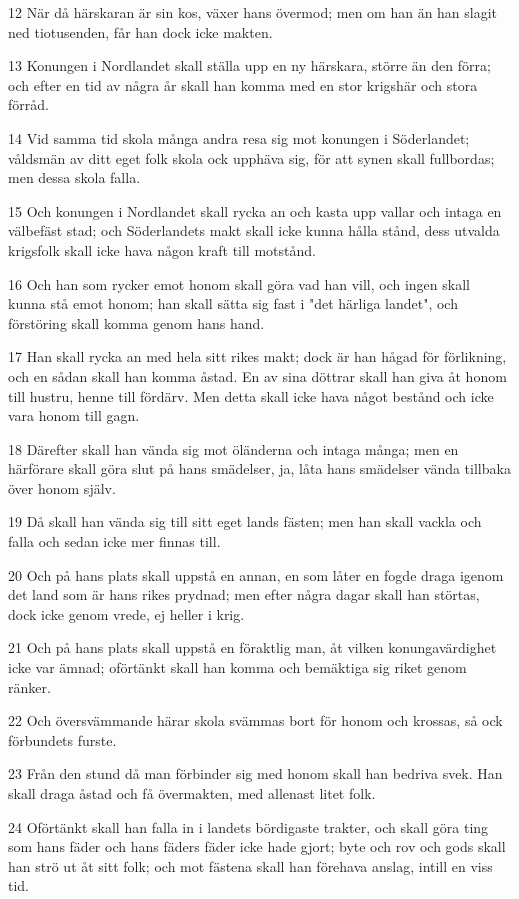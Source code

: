 \par 12 När då härskaran är sin kos, växer hans övermod; men om han än han slagit ned tiotusenden, får han dock icke makten.
\par 13 Konungen i Nordlandet skall ställa upp en ny härskara, större än den förra; och efter en tid av några år skall han komma med en stor krigshär och stora förråd.
\par 14 Vid samma tid skola många andra resa sig mot konungen i Söderlandet; våldsmän av ditt eget folk skola ock upphäva sig, för att synen skall fullbordas; men dessa skola falla.
\par 15 Och konungen i Nordlandet skall rycka an och kasta upp vallar och intaga en välbefäst stad; och Söderlandets makt skall icke kunna hålla stånd, dess utvalda krigsfolk skall icke hava någon kraft till motstånd.
\par 16 Och han som rycker emot honom skall göra vad han vill, och ingen skall kunna stå emot honom; han skall sätta sig fast i "det härliga landet", och förstöring skall komma genom hans hand.
\par 17 Han skall rycka an med hela sitt rikes makt; dock är han hågad för förlikning, och en sådan skall han komma åstad. En av sina döttrar skall han giva åt honom till hustru, henne till fördärv. Men detta skall icke hava något bestånd och icke vara honom till gagn.
\par 18 Därefter skall han vända sig mot öländerna och intaga många; men en härförare skall göra slut på hans smädelser, ja, låta hans smädelser vända tillbaka över honom själv.
\par 19 Då skall han vända sig till sitt eget lands fästen; men han skall vackla och falla och sedan icke mer finnas till.
\par 20 Och på hans plats skall uppstå en annan, en som låter en fogde draga igenom det land som är hans rikes prydnad; men efter några dagar skall han störtas, dock icke genom vrede, ej heller i krig.
\par 21 Och på hans plats skall uppstå en föraktlig man, åt vilken konungavärdighet icke var ämnad; oförtänkt skall han komma och bemäktiga sig riket genom ränker.
\par 22 Och översvämmande härar skola svämmas bort för honom och krossas, så ock förbundets furste.
\par 23 Från den stund då man förbinder sig med honom skall han bedriva svek. Han skall draga åstad och få övermakten, med allenast litet folk.
\par 24 Oförtänkt skall han falla in i landets bördigaste trakter, och skall göra ting som hans fäder och hans fäders fäder icke hade gjort; byte och rov och gods skall han strö ut åt sitt folk; och mot fästena skall han förehava anslag, intill en viss tid.
